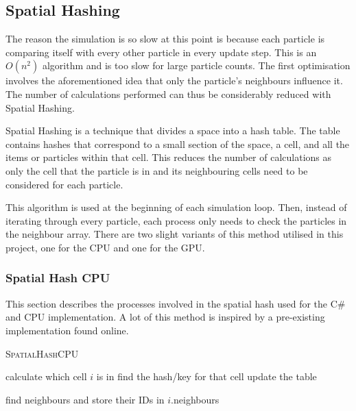 \documentclass[12pt]{article}
\begin{document}
    \subsection{Spatial Hashing}

    The reason the simulation is so slow at this point is because each particle is comparing itself with every other particle in every update step. This is an $O(n^2)$ algorithm and is too slow for large particle counts. The first optimisation involves the aforementioned idea that only the particle's neighbours influence it. The number of calculations performed can thus be considerably reduced with Spatial Hashing.

    Spatial Hashing is a technique that divides a space into a hash table. The table contains hashes that correspond to a small section of the space, a cell, and all the items or particles within that cell\cite{spatialpython}. This reduces the number of calculations as only the cell that the particle is in and its neighbouring cells need to be considered for each particle. 
    
    This algorithm is used at the beginning of each simulation loop. Then, instead of iterating through every particle, each process only needs to check the particles in the neighbour array. There are two slight variants of this method utilised in this project, one for the CPU and one for the GPU.

    \subsubsection{Spatial Hash CPU}

    This section describes the processes involved in the spatial hash used for the C\# and CPU implementation. A lot of this method is inspired by a pre-existing implementation found online\cite{sphspatialexample}.

    \begin{algorithm}[H]
        \caption{\textsc{SpatialHashCPU}}
    
        \begin{algorithmic}
                \State calculate which cell $i$ is in
                \State find the hash/key for that cell
                \State update the table
            \EndFor

                \State find neighbours and store their IDs in $i$.neighbours
            \EndFor
        \end{algorithmic}
    \end{algorithm}
\end{document}
